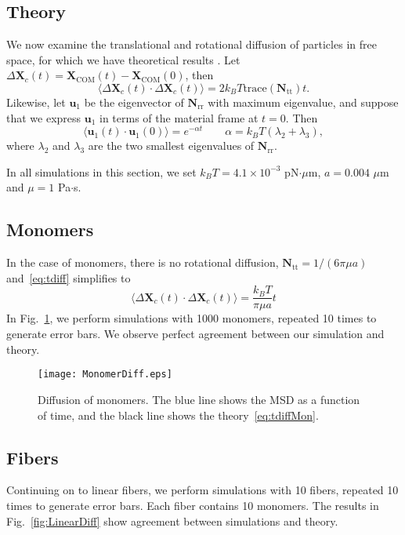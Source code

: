 \documentclass[11pt]{article}
\newcommand{\V}[1]{\boldsymbol{#1}}                 %
\newcommand{\M}[1]{\boldsymbol{#1}}
\begin{document}
\subsection{Theory}
We now examine the translational and rotational diffusion of particles in free space, for which we have theoretical results \cite{makino2004brownian}. Let $\Delta \V{X}_c(t) = \V{X}_\text{COM}(t)-\V{X}_\text{COM}(0)$, then 
\begin{equation}
\label{eq:tdiff}
\langle \Delta \V{X}_c(t) \cdot \Delta \V{X}_c(t) \rangle = 2 k_B T \text{trace}\left( \V{N}_\text{tt}\right)t.
\end{equation}
Likewise, let $\V{u}_1$ be the eigenvector of $\V{N}_\text{rr}$ with maximum eigenvalue, and suppose that we express $\V{u}_1$ in terms of the material frame at $t=0$. Then 
\begin{equation}
\label{eq:rdiff}
\langle \V{u}_1(t) \cdot \V{u}_1(0) \rangle = e^{-\alpha t} \qquad \alpha = k_B T \left(\lambda_2+\lambda_3\right),
\end{equation}
where $\lambda_2$ and $\lambda_3$ are the two smallest eigenvalues of $\M{N}_\text{rr}$.

In all simulations in this section, we set $k_B T=4.1 \times 10^{-3}$ pN$\cdot \mu$m, $a=0.004$ $\mu$m and $\mu=1$ Pa$\cdot$s.  

\subsection{Monomers}
In the case of monomers, there is no rotational diffusion, $\M{N}_\text{tt}=1/(6 \pi \mu a)$ and\ \eqref{eq:tdiff} simplifies to 
\begin{equation}
\label{eq:tdiffMon}
\langle \Delta \V{X}_c(t) \cdot \Delta \V{X}_c(t) \rangle = \frac{k_B T}{\pi \mu a}t
\end{equation}
In Fig.\ \ref{fig:MonDiff}, we perform simulations with 1000 monomers, repeated 10 times to generate error bars. We observe perfect agreement between our simulation and theory.

\begin{figure}
\centering
\texttt{[image: MonomerDiff.eps]}
\caption{\label{fig:MonDiff}Diffusion of monomers. The blue line shows the MSD as a function of time, and the black line shows the theory\ \eqref{eq:tdiffMon}.}
\end{figure}

\subsection{Fibers}
Continuing on to linear fibers, we perform simulations with 10 fibers, repeated 10 times to generate error bars. Each fiber contains 10 monomers. The results in Fig.\ \ref{fig:LinearDiff} show agreement between simulations and theory.
\end{document}

